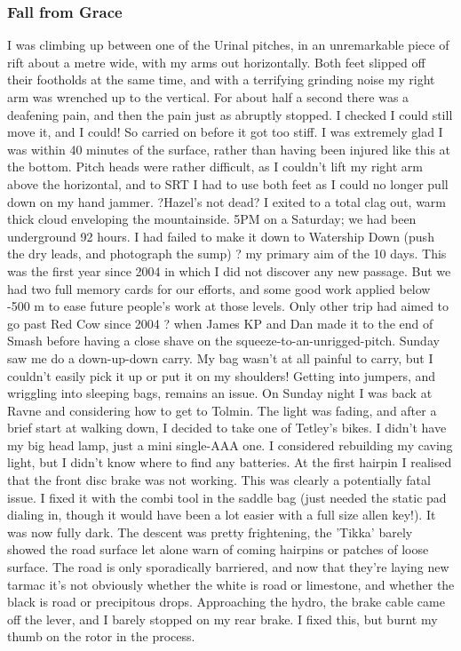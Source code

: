 \documentclass[onecolumn]{book}
\begin{document}
\subsubsection{Fall from Grace}
I was climbing up between one of the Urinal pitches, in an unremarkable piece of rift about a metre wide, with my arms out horizontally. Both feet slipped off their footholds at the same time, and with a terrifying grinding noise my right arm was wrenched up to the vertical. For about half a second there was a deafening pain, and then the pain just as abruptly stopped. I checked I could still move it, and I could! So carried on before it got too stiff. I was extremely glad I was within 40 minutes of the surface, rather than having been injured like this at the bottom. Pitch heads were rather difficult, as I couldn't lift my right arm above the horizontal, and to SRT I had to use both feet as I could no longer pull down on my hand jammer.
?Hazel's not dead?
I exited to a total clag out, warm thick cloud enveloping the mountainside.
5PM on a Saturday; we had been underground 92 hours.
I had failed to make it down to Watership Down (push the dry leads, and photograph the sump) ? my primary aim of the 10 days. This was the first year since 2004 in which I did not discover any new passage. But we had two full memory cards for our efforts, and some good work applied below -500 m to ease future people's work at those levels. Only other trip had aimed to go past Red Cow since 2004 ? when James KP and Dan made it to the end of Smash before having a close shave on the squeeze-to-an-unrigged-pitch.
Sunday saw me do a down-up-down carry. My bag wasn't at all painful to carry, but I couldn't easily pick it up or put it on my shoulders! Getting into jumpers, and wriggling into sleeping bags, remains an issue.
On Sunday night I was back at Ravne and considering how to get to Tolmin. The light was fading, and after a brief start at walking down, I decided to take one of Tetley's bikes. I didn't have my big head lamp, just a mini single-AAA one. I considered rebuilding my caving light, but I didn't know where to find any batteries.
At the first hairpin I realised that the front disc brake was not working. This was clearly a potentially fatal issue.
I fixed it with the combi tool in the saddle bag (just needed the static pad dialing in, though it would have been a lot easier with a full size allen key!). It was now fully dark.
The descent was pretty frightening, the 'Tikka' barely showed the road surface let alone warn of coming hairpins or patches of loose surface. The road is only sporadically barriered, and now that they're laying new tarmac it's not obviously whether the white is road or limestone, and whether the black is road or precipitous drops. Approaching the hydro, the brake cable came off the lever, and I barely stopped on my rear brake. I fixed this, but burnt my thumb on the rotor in the process.
\end{document}
